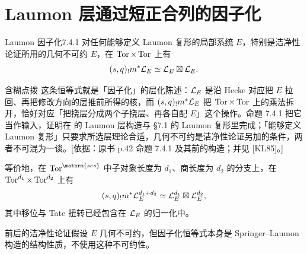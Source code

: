 \section{Laumon 层通过短正合列的因子化}\label{sec:7.4}
\begin{proposition}{Laumon 因子化\cite{KL85}}{7.4.1}
对任何能够定义 Laumon 复形的局部系统 $E$，特别是洁净性论证所用的几何不可约 $E$，在 $\operatorname{Tor}\times\operatorname{Tor}$ 上有
\[(s,q)_!m^*\mathcal{L}_E\simeq\mathcal{L}_E\boxtimes\mathcal{L}_E.\]
\begin{transnote}{含糊点拨}
这条恒等式就是「因子化」的层化陈述：$\mathcal{L}_E$ 是沿 Hecke 对应把 $E$ 拉回、再把修改方向的层推前所得的核，而 $(s,q)_!m^*\mathcal{L}_E$ 把 $\operatorname{Tor}\times\operatorname{Tor}$ 上的乘法拆开，恰好对应「把挠层分成两个子挠层、再各自配 $E$」这个操作。命题 7.4.1 把它当作输入，证明在  的 Laumon 层构造与 §7.1 的 Laumon 复形里完成；「能够定义 Laumon 复形」只要求所选层理论合适，几何不可约是洁净性论证另加的条件，两者不可混为一谈。[依据：原书 p.42 命题 7.4.1 及其前的构造；并见 [KL85]。]
\end{transnote}
等价地，在 $\Tor^{\mathrm{ses}}$ 中子对象长度为 $d_1$、商长度为 $d_2$ 的分支上，在 $\operatorname{Tor}^{d_1}\times\operatorname{Tor}^{d_2}$ 上有
\[(s,q)_!m^*\mathcal{L}_E^{d_1+d_2}\simeq\mathcal{L}_E^{d_1}\boxtimes\mathcal{L}_E^{d_2},\]
其中移位与 Tate 扭转已经包含在 $\mathcal{L}_E$ 的归一化中。
\end{proposition}
\begin{note}
前后的洁净性论证假设 $E$ 几何不可约，但因子化恒等式本身是 Springer–Laumon 构造的结构性质，不使用这种不可约性。
\end{note}
